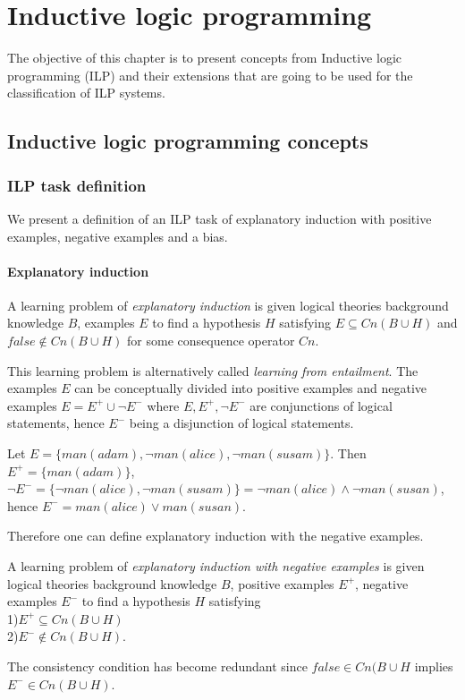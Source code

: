 \chapter{Inductive logic programming}
The objective of this chapter is to present concepts from Inductive logic programming (ILP) and their extensions that are going to be used for the classification of ILP systems.

\section{Inductive logic programming concepts}

\subsection{ILP task definition}
We present a definition of an ILP task of explanatory induction with positive examples, negative examples and a bias.

\subsubsection{Explanatory induction\cite{yamamoto2012inverse}}
\begin{defn}\cite{flach1996rationality} A learning problem of \emph{explanatory induction} is given logical theories background knowledge $B$, examples $E$ to find a hypothesis $H$ satisfying $E \subseteq Cn(B \cup H)$ and $false \not\in Cn(B \cup H)$ for some consequence operator $Cn$.
\end{defn}

This learning problem is alternatively called \emph{learning from entailment}\cite{muggleton1995inverse}\cite{de1997logical}. The examples $E$ can be conceptually divided into positive examples and negative examples $E=E^{+} \cup \neg E^{-}$ where $E, E^{+}, \neg E^{-}$ are conjunctions of logical statements, hence $E^{-}$ being a disjunction of logical statements.

\begin{exmp}\cite{explanatory_induction_example}
Let $E=\{man(adam), \neg man(alice), \neg man(susam)\}$. Then $E^{+}=\{man(adam)\}$,
$\neg E^{-} = \{\neg man(alice), \neg man(susam)\}=\neg man(alice) \land \neg man(susan)$, hence
$E^{-} = man(alice) \lor man(susan)$.
\end{exmp}

Therefore one can define explanatory induction with the negative examples.
\begin{defn}\label{explanatory_induction_with_negative_examples_definition}
A learning problem of \emph{explanatory induction with negative examples} is given logical theories background knowledge $B$, positive examples $E^{+}$, negative examples $E^{-}$ to find a hypothesis $H$ satisfying\\
1)$E^{+} \subseteq Cn(B \cup H)$\\
2)$E^{-} \not\in Cn(B \cup H)$.
\end{defn}
The consistency condition has become redundant since $false \in Cn(B \cup H$ implies $E^{-} \in Cn(B \cup H)$.

